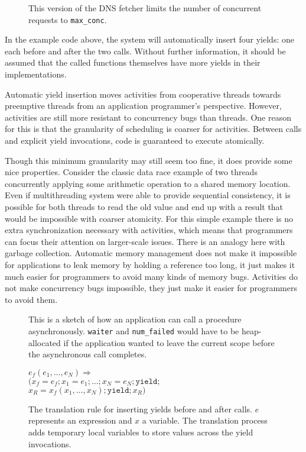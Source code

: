 \documentclass[a4paper,UKenglish,cleveref, autoref]{lipics-v2019}
\begin{document}
\begin{figure}
\caption{This version of the DNS fetcher limits the number of concurrent requests to \texttt{max\_conc}.}
\label{fig:charcoal_multidns_sem}
\end{figure}

In the example code above, the system will automatically insert four yields: one each before and after the two calls.
Without further information, it should be assumed that the called functions themselves have more yields in their implementations.

Automatic yield insertion moves activities from cooperative threads towards preemptive threads from an application programmer's perspective.
However, activities are still more resistant to concurrency bugs than threads.
One reason for this is that the granularity of scheduling is coarser for activities.
Between calls and explicit yield invocations, code is guaranteed to execute atomically.

Though this minimum granularity may still seem too fine, it does provide some nice properties.
Consider the classic data race example of two threads concurrently applying some arithmetic operation to a shared memory location.
Even if multithreading system were able to provide sequential consistency, it is possible for both threads to read the old value and end up with a result that would be impossible with coarser atomicity.
For this simple example there is no extra synchronization necessary with activities, which means that programmers can focus their attention on larger-scale issues.
There is an analogy here with garbage collection.
Automatic memory management does not make it impossible for applications to leak memory by holding a reference too long, it just makes it much easier for programmers to avoid many kinds of memory bugs.
Activities do not make concurrency bugs impossible, they just make it easier for programmers to avoid them.

\begin{figure}
\caption{This is a sketch of how an application can call a procedure asynchronously.
\texttt{waiter} and \texttt{num\_failed} would have to be heap-allocated if the application wanted to leave the current scope before the asynchronous call completes.}
\label{fig:charcoal_multidns_async_call}
\end{figure}

\begin{figure}
  $e_f(e_1, \ldots, e_N) \Rightarrow$ \\
  \hspace*{1em} $( x_f=e_f; x_1=e_1; \ldots; x_N=e_N; \mathtt{yield};$ \\
  \hspace*{2em} $x_R=x_f(x_1, \ldots, x_N); \mathtt{yield}; x_R )$
  \caption{The translation rule for inserting yields before and after calls.
    $e$ represents an expression and $x$ a variable.
  The translation process adds temporary local variables to store values across the yield invocations.}
    \label{fig:translation}
\end{figure}
\end{document}
